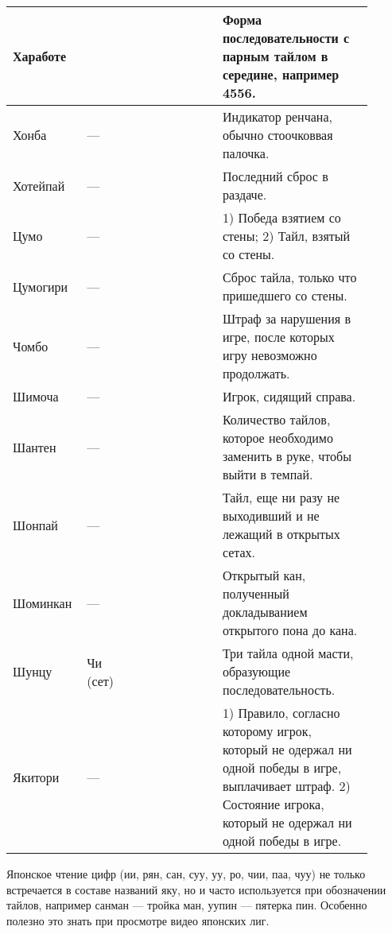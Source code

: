 \begin{tabularx}{\linewidth}{L{0.14\linewidth}L{0.13\linewidth}L{0.1\linewidth}L{0.13\linewidth}L{0.4\linewidth}}
	\midrule
	Хаработе & & & & Форма последовательности с парным тайлом в середине, например 4556. \\
	\midrule
	Хонба & --- &  &  & Индикатор ренчана, обычно стоочковвая палочка. \\
	\midrule
	Хотейпай & --- &  &  & Последний сброс в раздаче. \\
	\midrule
	Цумо & --- &  &  & 1) Победа взятием со стены; 2) Тайл, взятый со стены. \\
	\midrule
	Цумогири & --- &  &  & Сброс тайла, только что пришедшего со стены. \\
	\midrule
	Чомбо & --- &  &  & Штраф за нарушения в игре, после которых игру невозможно продолжать. \\
	\midrule
	Шимоча & --- &  &  & Игрок, сидящий справа. \\
	\midrule
	Шантен & --- &  &  & Количество тайлов, которое необходимо заменить в руке, чтобы выйти в темпай. \\
	\midrule
	Шонпай & --- &  &  & Тайл, еще ни разу не выходивший и не лежащий в открытых сетах. \\
	\midrule
	Шоминкан & --- &  &   & Открытый кан, полученный докладыванием открытого пона до кана. \\
	\midrule
	Шунцу & Чи (сет) &  &  & Три тайла одной масти, образующие последовательность. \\
	\midrule
	Якитори & --- &  &  & 1) Правило, согласно которому игрок, который не одержал ни одной победы в игре, выплачивает штраф. 2) Состояние игрока, который не одержал ни одной победы в игре. \\
\end{tabularx}

Японское чтение цифр (ии, рян, сан, суу, уу, ро, чии, паа, чуу) не только встречается в составе названий яку, но и часто используется при обозначении тайлов, например санман --- тройка ман, уупин --- пятерка пин. Особенно полезно это знать при просмотре видео японских лиг.

